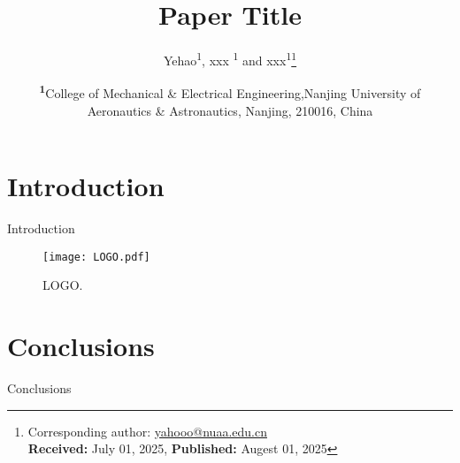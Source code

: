 \documentclass[
	letterpaper, %
	10pt, %
	unnumberedsections, %
	fleqn, %
]{styles/LTJournalArticle}
\title{Paper Title} %
\author{%
	Yehao\textsuperscript{1}, xxx \textsuperscript{1} and xxx\textsuperscript{1}\thanks{Corresponding author: \href{mailto:yahooo@nuaa.edu.cn}{yahooo@nuaa.edu.cn}\\ \textbf{Received:} July 01, 2025, \textbf{Published:} Augest 01, 2025}
}
\date{\footnotesize\textsuperscript{\textbf{1}}College of Mechanical \& Electrical Engineering,Nanjing University of Aeronautics \& Astronautics,  Nanjing, 210016, China}
\begin{document}
\maketitle %

\section{Introduction}
Introduction\cite{seemann_droplet_2012}
\begin{figure}[htbp]
	\centering
	\texttt{[image: LOGO.pdf]}
	\caption{LOGO.}
	\label{fig:SurfaceDiff}
\end{figure}

\section{Conclusions}
Conclusions







\newpage
\printbibliography%

\end{document}
